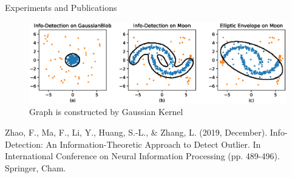 \documentclass[notheorems]{beamer}
\begin{document}
 \begin{frame}{Experiments and Publications}
 \begin{figure}
 	\centering
 	\includegraphics[width=\textwidth]{pic/outlier_boundary_illustration.eps}
 	\caption{Graph is constructed by Gaussian Kernel} \label{fig:boundary}
 \end{figure}

\normalsize Zhao, F., Ma, F., Li, Y., Huang, S.-L., \& Zhang, L.
 (2019, December).
 Info-Detection: An Information-Theoretic Approach to Detect Outlier. In International Conference on Neural Information Processing (pp. 489-496). Springer, Cham.

 \end{frame}
\end{document}
